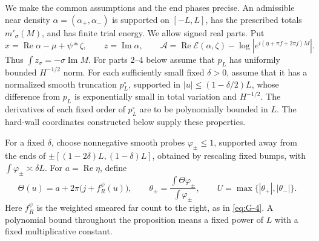 We make the common assumptions and the end phases precise.  An admissible
near density \(\alpha=(\alpha_+,\alpha_-)\) is supported on \([-L,L]\),
has the prescribed totals \(m'_\sigma(M)\), and has finite trial energy.
We allow signed real parts.  Put
\[
 x=\operatorname{Re}\alpha-\mu+\psi*\zeta,
 \qquad z=\operatorname{Im}\alpha,
 \qquad
 \mathcal A=\operatorname{Re}\mathcal E(\alpha,\zeta)
             -\log\left|e^{i(\eta+\pi f+2\pi j)M}\right|.
\]
Thus \(\int z_\sigma=-\sigma\operatorname{Im}M\).
For parts 2--4 below assume that \(p_L\) has uniformly bounded
\(H^{-1/2}\) norm.  For each sufficiently small fixed \(\delta>0\),
assume that it has a normalized smooth truncation \(p_L^\circ\), supported
in \(|u|\le(1-\delta/2)L\), whose difference from \(p_L\) is exponentially
small in total variation and \(H^{-1/2}\).  The derivatives of each fixed
order of \(p_L^\circ\) are to be polynomially bounded in \(L\).
The hard-wall coordinates constructed below supply these properties.

For a fixed \(\delta\), choose nonnegative smooth probes
\(\varphi_\pm\le1\), supported away from the ends of
\(\pm[(1-2\delta)L,(1-\delta)L]\), obtained by rescaling fixed bumps,
with \(\int\varphi_\pm\asymp\delta L\).  For
\(a=\operatorname{Re}\eta\), define
\[
 \Theta(u)=a+2\pi\bigl(j+f_R^\psi(u)\bigr),\qquad
 \theta_\pm=\frac{\int\Theta\varphi_\pm}{\int\varphi_\pm},
 \qquad U=\max\{|\theta_+|,|\theta_-|\}.
\]
Here \(f_R^\psi\) is the weighted smeared far count to the right,
as in \eqref{eq:G-4}.  A polynomial bound throughout the proposition
means a fixed power of \(L\) with a fixed multiplicative constant.

